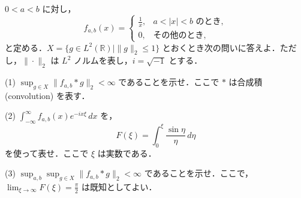 \documentclass[12pt]{jlreq}
\newcommand{\R}{\mathbb{R}}
\newcommand{\dd}{\,d}
\begin{document}
\(0 < a < b\) に対し，
\[
  f_{a,b}(x) = \begin{cases} \frac{1}{x}, & a < |x| < b \text{ のとき}, \\ 0, & \text{その他のとき}, \end{cases}
\]
と定める．\(X = \{ g \in L^2(\R) \mid \|g\|_2 \le 1 \}\) とおくとき次の問いに答えよ．ただし，\(\|\cdot\|_2\) は \(L^2\) ノルムを表し，\(i = \sqrt{-1}\) とする．

(1) \(\sup_{g \in X} \|f_{a,b} * g\|_2 < \infty\) であることを示せ．ここで \(*\) は合成積 (convolution) を表す．

(2) \(\int_{-\infty}^\infty f_{a,b}(x) e^{-ix\xi} \dd x\) を，
  \[
    F(\xi) = \int_0^\xi \frac{\sin\eta}{\eta} \dd\eta
  \]
  を使って表せ．ここで \(\xi\) は実数である．

(3) \(\sup_{a,b} \sup_{g \in X} \|f_{a,b} * g\|_2 < \infty\) であることを示せ．ここで，\(\lim_{\xi \to \infty} F(\xi) = \frac{\pi}{2}\) は既知としてよい．
\end{document}
